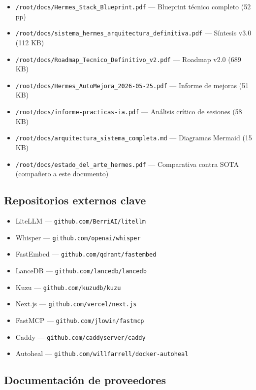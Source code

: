 \documentclass[11pt,a4paper]{article}
\begin{document}
\begin{itemize}[leftmargin=*,itemsep=1pt]
\item \texttt{/root/docs/Hermes\_Stack\_Blueprint.pdf} — Blueprint técnico completo (52 pp)
\item \texttt{/root/docs/sistema\_hermes\_arquitectura\_definitiva.pdf} — Síntesis v3.0 (112 KB)
\item \texttt{/root/docs/Roadmap\_Tecnico\_Definitivo\_v2.pdf} — Roadmap v2.0 (689 KB)
\item \texttt{/root/docs/Hermes\_AutoMejora\_2026-05-25.pdf} — Informe de mejoras (51 KB)
\item \texttt{/root/docs/informe-practicas-ia.pdf} — Análisis crítico de sesiones (58 KB)
\item \texttt{/root/docs/arquitectura\_sistema\_completa.md} — Diagramas Mermaid (15 KB)
\item \texttt{/root/docs/estado\_del\_arte\_hermes.pdf} — Comparativa contra SOTA (compañero a este documento)
\end{itemize}

\subsection{Repositorios externos clave}

\begin{itemize}[leftmargin=*,itemsep=1pt]
\item LiteLLM — \texttt{github.com/BerriAI/litellm}
\item Whisper — \texttt{github.com/openai/whisper}
\item FastEmbed — \texttt{github.com/qdrant/fastembed}
\item LanceDB — \texttt{github.com/lancedb/lancedb}
\item Kuzu — \texttt{github.com/kuzudb/kuzu}
\item Next.js — \texttt{github.com/vercel/next.js}
\item FastMCP — \texttt{github.com/jlowin/fastmcp}
\item Caddy — \texttt{github.com/caddyserver/caddy}
\item Autoheal — \texttt{github.com/willfarrell/docker-autoheal}
\end{itemize}

\subsection{Documentación de proveedores}
\end{document}
